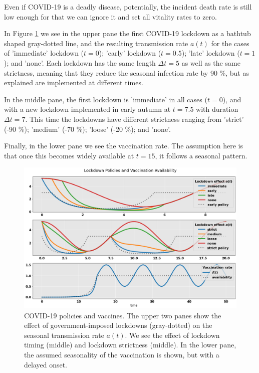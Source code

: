 \documentclass[]{article}
\begin{document}
Even if COVID-19 is a deadly disease, potentially, the incident death rate is still low enough for that we can ignore it and set all vitality rates to zero.

In Figure \ref{fig:covid-policy} we see in the upper pane the first COVID-19 lockdown as a bathtub shaped gray-dotted line, and the resulting transmission rate $a(t)$ for the cases of 'immediate' lockdown ($t=0$); 'early' lockdown ($t=0.5$); 'late' lockdown ($t=1$); and 'none'. Each lockdown has the same length $\Delta t = 5$ as well as the same strictness, meaning that they reduce the seasonal infection rate by 90 \%, but as explained are implemented at different times. 

In the middle pane, the first lockdown is 'immediate' in all cases ($t=0$), and with a new lockdown implemented in early autumn at $t=7.5$ with duration $\Delta t = 7$. This time the lockdowns have different strictness ranging from 'strict' (-90 \%); 'medium' (-70 \%); 'loose' (-20 \%); and 'none'.

Finally, in the lower pane we see the vaccination rate. The assumption here is that once this becomes widely available at $t=15$, it follows a seasonal pattern.

\begin{figure}[!h]
	\centering
	\includegraphics[width=1\linewidth]{./figs/covid-policy.png}
	\caption{COVID-19 policies and vaccines. The upper two panes show the effect of government-imposed lockdowns (gray-dotted) on the seasonal transmission rate $a(t)$. We see the effect of lockdown timing (middle) and lockdown strictness (middle). In the lower pane, the assumed seasonality of the vaccination is shown, but with a delayed onset.}
	\label{fig:covid-policy}
\end{figure}
\end{document}
